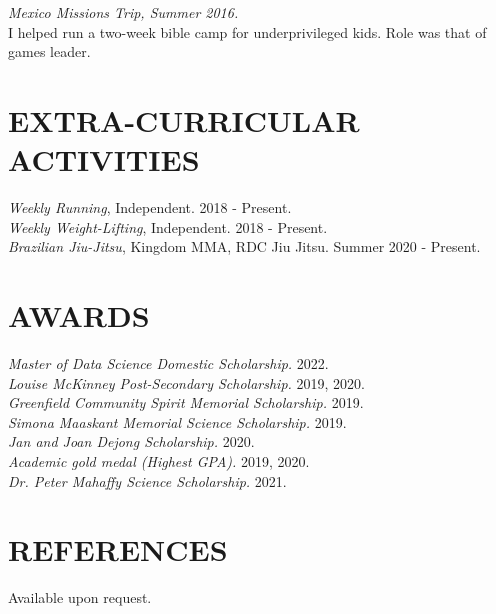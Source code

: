 \documentclass[margin, 10pt]{res} %
\begin{document}
\begin{resume}

{\it Mexico Missions Trip, Summer 2016.} \\
I helped run a two-week bible camp for underprivileged kids. Role was that of games leader.



\section{EXTRA-CURRICULAR \\ ACTIVITIES}

{\it Weekly Running}, Independent. 2018 - Present. \\
{\it Weekly Weight-Lifting}, Independent. 2018 - Present. \\
{\it Brazilian Jiu-Jitsu}, Kingdom MMA, RDC Jiu Jitsu. Summer 2020 - Present.



\section{AWARDS}

{\sl Master of Data Science Domestic Scholarship.}
2022. \\
{\sl Louise McKinney Post-Secondary Scholarship.}
2019, 2020. \\
{\sl Greenfield Community Spirit Memorial Scholarship.} 2019. \\ %
{\sl Simona Maaskant Memorial Science Scholarship.} 2019. \\
{\sl Jan and Joan Dejong Scholarship.} 2020. \\
{\sl Academic gold medal (Highest GPA).} 2019, 2020. \\
{\sl Dr. Peter Mahaffy Science Scholarship.} 2021.

\vfill

\section{REFERENCES}

Available upon request.


\end{resume}
\end{document}
